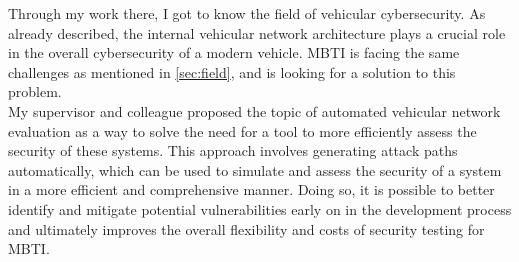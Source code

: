 Through my work there, I got to know the field of vehicular cybersecurity.
As already described, the internal vehicular network architecture plays a crucial role in the overall cybersecurity of a modern vehicle.
MBTI is facing the same challenges as mentioned in \ref{sec:field}, and is looking for a solution to this problem.\\

My supervisor and colleague proposed the topic of automated vehicular network evaluation as a way 
to solve the need for a tool to more efficiently assess the security of these systems.
This approach involves generating attack paths automatically, 
which can be used to simulate and assess the security of a system in a more efficient and comprehensive manner. 
Doing so, it is possible to better identify and mitigate potential vulnerabilities early on in the development process
and ultimately improves the overall flexibility and costs of security testing for MBTI.